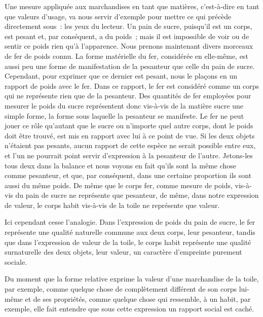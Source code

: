 \documentclass[french,twoside]{book} %
\begin{document}
Une mesure appliquée aux marchandises en tant que matières, c’est-à-dire en tant que valeurs d’usage, va nous servir d’exemple pour mettre ce qui précède directement sous : les yeux du lecteur. Un pain de sucre, puisqu’il est un corps, est pesant et, par conséquent, a du poids ; mais il est impossible de voir ou de sentir ce poids rien qu’à l’apparence. Nous prenons maintenant divers morceaux de fer de poids connu. La forme matérielle du fer, considérée en elle-même, est aussi peu une forme de manifestation de la pesanteur que celle du pain de sucre. Cependant, pour exprimer que ce dernier est pesant, nous le plaçons en un rapport de poids avec le fer. Dans ce rapport, le fer est considéré comme un corps qui ne représente rien que de la pesanteur. Des quantités de fer employées pour mesurer le poids du sucre représentent donc vis-à-vis de la matière sucre une simple forme, la forme sous laquelle la pesanteur se manifeste. Le fer ne peut jouer ce rôle qu’autant que le sucre ou n’importe quel autre corps, dont le poids doit être trouvé, est mis en rapport avec lui à ce point de vue. Si les deux objets n’étaient pas pesants, aucun rapport de cette espèce ne serait possible entre eux, et l’un ne pourrait point servir d’expression à la pesanteur de l’autre. Jetons-les tous deux dans la balance et nous voyons en fait qu’ils sont la même chose comme pesanteur, et que, par conséquent, dans une certaine proportion ils sont aussi du même poids. De même que le corps fer, comme mesure de poids, vis-à-vis du pain de sucre ne représente que pesanteur, de même, dans notre expression de valeur, le corps habit vis-à-vis de la toile ne représente que valeur.\par
Ici cependant cesse l’analogie. Dans l’expression de poids du pain de sucre, le fer représente une qualité naturelle commune aux deux corps, leur pesanteur, tandis que dans l’expression de valeur de la toile, le corps habit représente une qualité surnaturelle des deux objets, leur valeur, un caractère d’empreinte purement sociale.\par
Du moment que la forme relative exprime la valeur d’une marchandise de la toile, par exemple, comme quelque chose de complètement différent de son corps lui-même et de ses propriétés, comme quelque chose qui ressemble, à un habit, par exemple, elle fait entendre que sous cette expression un rapport social est caché.\par
\end{document}
